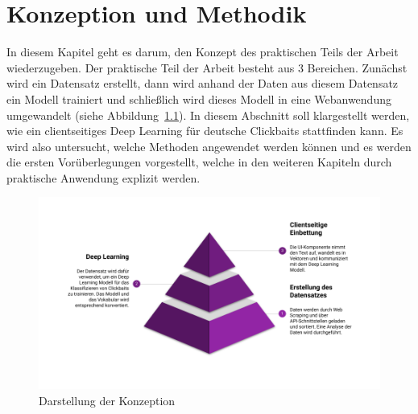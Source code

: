 \chapter{Konzeption und Methodik}\label{ch5}
In diesem Kapitel geht es darum, den Konzept des praktischen Teils der Arbeit wiederzugeben. Der praktische Teil der Arbeit besteht aus 3 Bereichen. Zunächst wird ein Datensatz erstellt, dann wird anhand der Daten aus diesem Datensatz ein Modell trainiert und schließlich wird dieses Modell in eine Webanwendung umgewandelt (siehe Abbildung~\ref{Kap5:Konzeption}). In diesem Abschnitt soll klargestellt werden, wie ein clientseitiges Deep Learning für deutsche Clickbaits stattfinden kann. Es wird also untersucht, welche Methoden angewendet werden können und es werden die ersten Vorüberlegungen vorgestellt, welche in den weiteren Kapiteln durch praktische Anwendung explizit werden.

\begin{figure}[H]
    \centering
    \includegraphics[width=15cm]{kapitel5/main_p.png}
    \caption[Darstellung der Konzeption]{Darstellung der Konzeption}
    \label{Kap5:Konzeption}
\end{figure}



